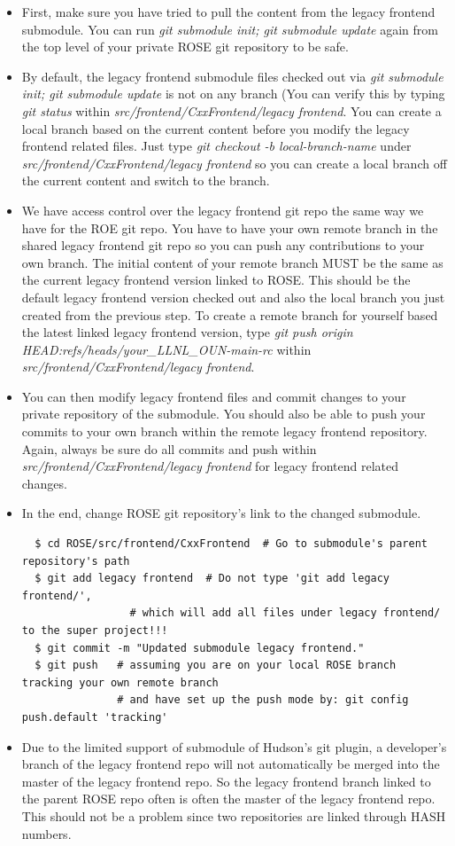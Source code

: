 \begin{itemize}
\begin{itemize}
  \item First, make sure you have tried to pull the content from the legacy frontend submodule. You can run \textit{git submodule init; git submodule update} again from the top level of your private ROSE git repository to be safe. 
  \item By default, the legacy frontend submodule files checked out via \textit{git submodule init; git submodule update} is not on any branch (You can verify this by typing \textit{git status} within \textit{src/frontend/CxxFrontend/legacy frontend}.  
You can create a local branch based on the current content before you modify the legacy frontend related files. Just type \textit{git checkout -b local-branch-name} under \textit{src/frontend/CxxFrontend/legacy frontend} so you can create a local branch off the current content and switch to the branch.
   \item We have access control over the legacy frontend git repo the same way we have
   for the ROE git repo. You have to have your own remote branch in
   the shared legacy frontend git repo so you can push any contributions to your own
   branch. The initial content of your remote branch
   MUST be the same as the current legacy frontend version linked to ROSE. This
   should be the default legacy frontend version checked out and also the local branch
   you just created from the previous step. To create a remote branch for
   yourself based the latest linked legacy frontend version, type 
   \textit{git push origin HEAD:refs/heads/your\_LLNL\_OUN-main-rc} within \textit{src/frontend/CxxFrontend/legacy frontend}.
   \item You can then modify legacy frontend files and commit changes to your private repository of the submodule. 
         You should also be able to push your commits to your own branch
         within the remote legacy frontend repository.
         Again, always be sure do all commits and push within \textit{src/frontend/CxxFrontend/legacy frontend} for legacy frontend related changes. 
   \item In the end, change ROSE git repository's link to the changed submodule. 
  \begin{verbatim}
  $ cd ROSE/src/frontend/CxxFrontend  # Go to submodule's parent repository's path 
  $ git add legacy frontend  # Do not type 'git add legacy frontend/', 
                 # which will add all files under legacy frontend/ to the super project!!!
  $ git commit -m "Updated submodule legacy frontend."
  $ git push   # assuming you are on your local ROSE branch tracking your own remote branch 
               # and have set up the push mode by: git config push.default 'tracking'
  \end{verbatim}  
  \item Due to the limited support of submodule of Hudson's git plugin, a developer's branch
  of the legacy frontend repo will not automatically be merged into the master of the legacy frontend repo. So
  the legacy frontend branch linked to the parent ROSE repo often is often the master of
  the legacy frontend repo. This should not be a problem since two repositories are
  linked through HASH numbers. 
   

\end{itemize}
\end{itemize}
